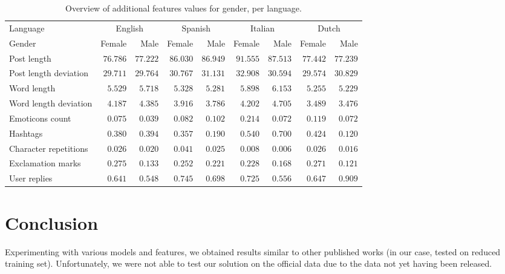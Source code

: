 \documentclass[10pt, a4paper]{article}
\begin{document}
\begin{table*}
\caption{Overview of additional features values for gender, per language.}
\label{tab:additionalfeatures-gender}
\begin{center}
\begin{tabular}{l|rr|rr|rr|rr}
\toprule
Language & \multicolumn{2}{|c|}{English} & \multicolumn{2}{|c}{Spanish} & \multicolumn{2}{|c}{Italian} & \multicolumn{2}{|c}{Dutch} \\
Gender & Female & Male & Female & Male & Female & Male & Female & Male \\
\midrule
Post length & $ 76.786 $ & $ 77.222 $ & $ 86.030 $ & $ 86.949 $ & $ 91.555 $ & $ 87.513 $ & $ 77.442 $ & $ 77.239 $ \\
Post length deviation & $ 29.711 $ & $ 29.764 $ & $ 30.767 $ & $ 31.131 $ & $ 32.908 $ & $ 30.594 $ & $ 29.574 $ & $ 30.829 $ \\
Word length & $ 5.529 $ & $ 5.718 $ & $ 5.328 $ & $ 5.281 $ & $ 5.898 $ & $ 6.153 $ & $ 5.255 $ & $ 5.229 $ \\
Word length deviation & $ 4.187 $ & $ 4.385 $ & $ 3.916 $ & $ 3.786 $ & $ 4.202 $ & $ 4.705 $ & $ 3.489 $ & $ 3.476 $ \\
Emoticons count & $ 0.075 $ & $ 0.039 $ & $ 0.082 $ & $ 0.102 $ & $ 0.214 $ & $ 0.072 $ & $ 0.119 $ & $ 0.072 $ \\
Hashtags &  $ 0.380 $ & $ 0.394 $ & $ 0.357 $ & $ 0.190 $ & $ 0.540 $ & $ 0.700 $ & $ 0.424 $ & $ 0.120 $ \\
Character repetitions & $ 0.026 $ & $ 0.020 $ & $ 0.041 $ & $ 0.025 $ & $ 0.008 $ & $ 0.006 $ & $ 0.026 $ & $ 0.016 $ \\
Exclamation marks & $ 0.275 $ & $ 0.133 $ & $ 0.252 $ & $ 0.221 $ & $ 0.228 $ & $ 0.168 $ & $ 0.271 $ & $ 0.121 $ \\
User replies & $ 0.641 $ & $ 0.548 $ & $ 0.745 $ & $ 0.698 $ & $ 0.725 $ & $ 0.556 $ & $ 0.647 $ & $ 0.909 $ \\
\bottomrule
\end{tabular}
\end{center}
\end{table*}

\section{Conclusion}
Experimenting with various models and features, we obtained results similar to other published works (in our case, tested on reduced training set).
Unfortunately, we were not able to test our solution on the official data due to the data not yet having been released.
\end{document}
